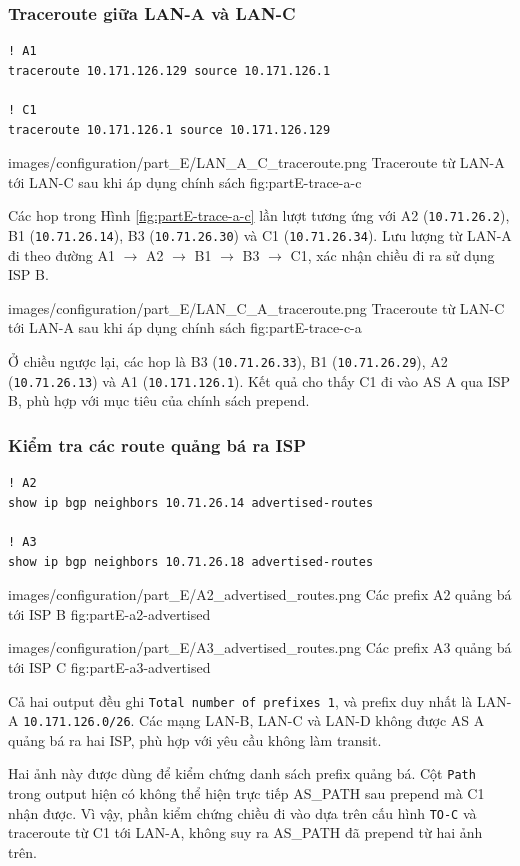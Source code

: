 \subsubsection{Traceroute giữa LAN-A và LAN-C}

\begin{lstlisting}
! A1
traceroute 10.171.126.129 source 10.171.126.1

! C1
traceroute 10.171.126.1 source 10.171.126.129
\end{lstlisting}

\partzeroimage
{images/configuration/part_E/LAN_A_C_traceroute.png}
{Traceroute từ LAN-A tới LAN-C sau khi áp dụng chính sách}
{fig:partE-trace-a-c}

Các hop trong Hình \ref{fig:partE-trace-a-c}
lần lượt tương ứng với A2
(\texttt{10.71.26.2}), B1
(\texttt{10.71.26.14}), B3
(\texttt{10.71.26.30}) và C1
(\texttt{10.71.26.34}).
Lưu lượng từ LAN-A đi theo đường
A1 $\rightarrow$ A2 $\rightarrow$ B1
$\rightarrow$ B3 $\rightarrow$ C1,
xác nhận chiều đi ra sử dụng ISP B.

\partzeroimage
{images/configuration/part_E/LAN_C_A_traceroute.png}
{Traceroute từ LAN-C tới LAN-A sau khi áp dụng chính sách}
{fig:partE-trace-c-a}

Ở chiều ngược lại, các hop là B3
(\texttt{10.71.26.33}), B1
(\texttt{10.71.26.29}), A2
(\texttt{10.71.26.13}) và A1
(\texttt{10.171.126.1}).
Kết quả cho thấy C1 đi vào AS A qua ISP B,
phù hợp với mục tiêu của chính sách prepend.

\subsubsection{Kiểm tra các route quảng bá ra ISP}

\begin{lstlisting}
! A2
show ip bgp neighbors 10.71.26.14 advertised-routes

! A3
show ip bgp neighbors 10.71.26.18 advertised-routes
\end{lstlisting}

\partzeroimage
{images/configuration/part_E/A2_advertised_routes.png}
{Các prefix A2 quảng bá tới ISP B}
{fig:partE-a2-advertised}

\partzeroimage
{images/configuration/part_E/A3_advertised_routes.png}
{Các prefix A3 quảng bá tới ISP C}
{fig:partE-a3-advertised}

Cả hai output đều ghi \texttt{Total number of prefixes 1},
và prefix duy nhất là LAN-A
\texttt{10.171.126.0/26}.
Các mạng LAN-B, LAN-C và LAN-D
không được AS A quảng bá ra hai ISP,
phù hợp với yêu cầu không làm transit.

Hai ảnh này được dùng để kiểm chứng
danh sách prefix quảng bá.
Cột \texttt{Path} trong output hiện có
không thể hiện trực tiếp AS\_PATH sau prepend
mà C1 nhận được.
Vì vậy, phần kiểm chứng chiều đi vào
dựa trên cấu hình \texttt{TO-C}
và traceroute từ C1 tới LAN-A,
không suy ra AS\_PATH đã prepend từ hai ảnh trên.

\newpage
